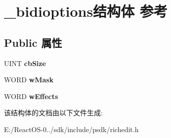 \hypertarget{struct__bidioptions}{}\section{\+\_\+bidioptions结构体 参考}
\label{struct__bidioptions}
\subsection*{Public 属性}
\begin{DoxyCompactItemize}
\item 
\mbox{\label{struct__bidioptions_a9d18d45da0edbd6d14043a008adf79b4}} 
U\+I\+NT {\bfseries cb\+Size}
\item 
\mbox{\label{struct__bidioptions_a64770460d64e64ca44867af10066d857}} 
W\+O\+RD {\bfseries w\+Mask}
\item 
\mbox{\label{struct__bidioptions_a7c02bedbd7bcc857cf51e1bc666b410a}} 
W\+O\+RD {\bfseries w\+Effects}
\end{DoxyCompactItemize}


该结构体的文档由以下文件生成\+:\begin{DoxyCompactItemize}
\item 
E\+:/\+React\+O\+S-\/0../sdk/include/psdk/richedit.\+h\end{DoxyCompactItemize}
